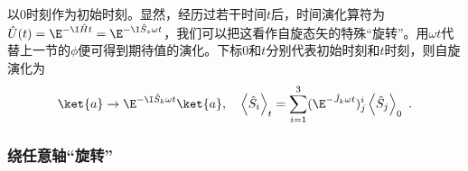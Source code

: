 以$0$时刻作为初始时刻。显然，经历过若干时间$t$后，时间演化算符为$\hat U(t)=\E^{-\I\hat H t}=\E^{-\I\hat S_z\omega t}$，我们可以把这看作自旋态矢的特殊“旋转”。用$\omega t$代替上一节的$\phi$便可得到期待值的演化。下标$0$和$t$分别代表初始时刻和$t$时刻，则自旋演化为
\begin{equation}
\ket{a}\rightarrow \E^{-\I \hat S_k\omega t}\ket{a},\quad \left\langle \hat S_{i}\right\rangle_t=\sum^{3}_{i=1}(\E^{-\hat J_k\omega t})^i_j\left\langle \hat S_{j}\right\rangle_0 ~.
\end{equation}
\subsubsection{绕任意轴“旋转”}



